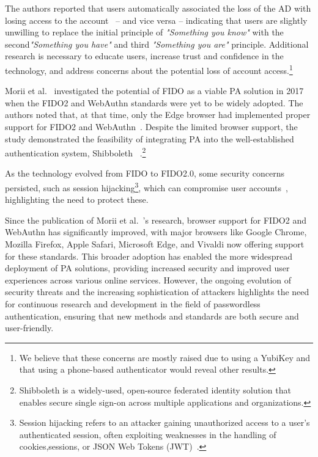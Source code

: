 The authors reported that users automatically associated the loss of the AD with
losing access to the account~\cite{ghrobany2020fido2} -- and vice versa --
indicating that users are slightly unwilling to replace the initial principle of
\textit{"Something you know"} with the second\textit{"Something you have"} and
third \textit{"Something you are"} principle.
Additional research is necessary to educate users, increase trust and confidence
in the technology, and address concerns about the potential loss of account
access.\footnote{
  We believe that these concerns are mostly raised due to using a YubiKey
  and that using a phone-based authenticator would reveal other results.
}

Morii et al.~\cite{morii2017research} investigated the potential of FIDO as a
viable PA solution in 2017 when the FIDO2 and WebAuthn standards were yet to be
widely adopted.
The authors noted that, at that time, only the Edge browser had implemented
proper support for FIDO2 and WebAuthn~\cite{morii2017research}.
Despite the limited browser support, the study demonstrated the feasibility
of integrating PA into the well-established authentication system, Shibboleth
~\cite{shibboleth, morii2017research}.\footnote{
  Shibboleth is a widely-used, open-source federated identity solution that
  enables secure single sign-on across multiple applications and organizations.
}


As the technology evolved from FIDO to FIDO2.0, some security concerns
persisted, such as session hijacking\footnote{
  Session hijacking refers to an attacker gaining unauthorized access to a
  user's authenticated session, often exploiting weaknesses in the handling of
  cookies,sessions, or JSON Web Tokens (JWT)~\cite{subsec:json-web-tokens}.
}, which can compromise user accounts~\cite{morii2017research}, highlighting
the need to protect these.

Since the publication of Morii et al.~'s research, browser support for FIDO2 and
WebAuthn has significantly improved, with major browsers like Google Chrome,
Mozilla Firefox, Apple Safari, Microsoft Edge, and Vivaldi now offering
support for these standards.
This broader adoption has enabled the more widespread deployment of PA solutions,
providing increased security and improved user experiences across various online
services.
However, the ongoing evolution of security threats and the increasing
sophistication of attackers highlights the need for continuous research and
development in the field of passwordless authentication, ensuring that new
methods and standards are both secure and user-friendly.

